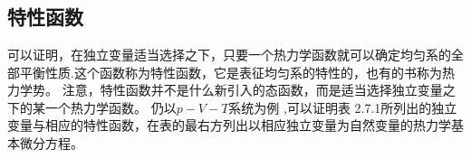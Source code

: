 \section{}








\subsection{特性函数}
可以证明，在独立变量适当选择之下，只要一个热力学函数就可以确定均匀系的全部平衡性质.这个函数称为特性函数，它是表征均匀系的特性的，也有的书称为热力学势。
注意，特性函数并不是什么新引入的态函数，而是适当选择独立变量之下的某一个热力学函数。
仍以$p-V-T$系统为例 ,可以证明表 2.7.1所列出的独立变量与相应的特性函数，在表的最右方列出以相应独立变量为自然变量的热力学基本微分方程。
